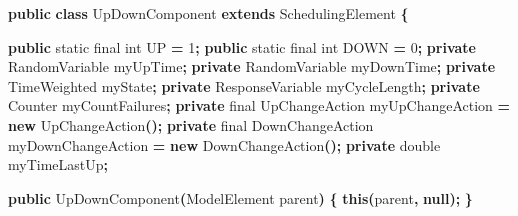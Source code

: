 \documentclass[
]{book}
\newenvironment{Shaded}{\begin{snugshade}}{\end{snugshade}}
\newcommand{\DataTypeTok}[1]{\textcolor[rgb]{0.13,0.29,0.53}{#1}}
\newcommand{\DecValTok}[1]{\textcolor[rgb]{0.00,0.00,0.81}{#1}}
\newcommand{\FunctionTok}[1]{\textcolor[rgb]{0.00,0.00,0.00}{#1}}
\newcommand{\KeywordTok}[1]{\textcolor[rgb]{0.13,0.29,0.53}{\textbf{#1}}}
\newcommand{\NormalTok}[1]{#1}
\newcommand{\OperatorTok}[1]{\textcolor[rgb]{0.81,0.36,0.00}{\textbf{#1}}}
\theoremstyle{definition}
\theoremstyle{definition}
\theoremstyle{definition}
\theoremstyle{definition}
\theoremstyle{remark}
\begin{document}
\begin{Shaded}
\begin{Highlighting}[]
\KeywordTok{public} \KeywordTok{class}\NormalTok{ UpDownComponent }\KeywordTok{extends}\NormalTok{ SchedulingElement }\OperatorTok{\{}

    \KeywordTok{public} \DataTypeTok{static} \DataTypeTok{final} \DataTypeTok{int}\NormalTok{ UP }\OperatorTok{=} \DecValTok{1}\OperatorTok{;}
    \KeywordTok{public} \DataTypeTok{static} \DataTypeTok{final} \DataTypeTok{int}\NormalTok{ DOWN }\OperatorTok{=} \DecValTok{0}\OperatorTok{;}
    \KeywordTok{private}\NormalTok{ RandomVariable myUpTime}\OperatorTok{;}
    \KeywordTok{private}\NormalTok{ RandomVariable myDownTime}\OperatorTok{;}
    \KeywordTok{private}\NormalTok{ TimeWeighted myState}\OperatorTok{;}
    \KeywordTok{private}\NormalTok{ ResponseVariable myCycleLength}\OperatorTok{;}
    \KeywordTok{private}\NormalTok{ Counter myCountFailures}\OperatorTok{;}
    \KeywordTok{private} \DataTypeTok{final}\NormalTok{ UpChangeAction myUpChangeAction }\OperatorTok{=} \KeywordTok{new} \FunctionTok{UpChangeAction}\OperatorTok{();}
    \KeywordTok{private} \DataTypeTok{final}\NormalTok{ DownChangeAction myDownChangeAction }\OperatorTok{=} \KeywordTok{new} \FunctionTok{DownChangeAction}\OperatorTok{();}
    \KeywordTok{private} \DataTypeTok{double}\NormalTok{ myTimeLastUp}\OperatorTok{;}

    \KeywordTok{public} \FunctionTok{UpDownComponent}\OperatorTok{(}\NormalTok{ModelElement parent}\OperatorTok{)} \OperatorTok{\{}
        \KeywordTok{this}\OperatorTok{(}\NormalTok{parent}\OperatorTok{,} \KeywordTok{null}\OperatorTok{);}
    \OperatorTok{\}}


\end{Highlighting}
\end{Shaded}
\end{document}
